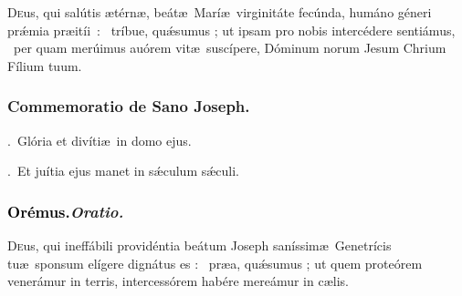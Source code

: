 \documentclass[12pt]{article} %
\newenvironment{response}{\leftskip 0in \setlength{\parindent}{0in}}{\vspace{2 mm}}
\let\oldgresixstar\gresixstar
\renewcommand{\gresixstar}{\textcolor{benred8}{\oldgresixstar}}
\let\oldgredagger\gredagger
\renewcommand{\gredagger}{\textcolor{benred8}{\oldgredagger}}
\let\oldVbar\Vbar
\renewcommand{\Vbar}{\textcolor{benred8}{\oldVbar .}}
\let\oldRbar\Rbar
\renewcommand{\Rbar}{\textcolor{benred8}{\oldRbar .}}
\def\capitulumSpace{\hspace{20 mm}}
\begin{document}
\begin{response}\lettrine{D}{e}us, qui sal\'{u}tis \ae t\'{e}rn\ae , be\'{a}t\ae\ Mar\'{i}\ae\ virginit\'{a}te fec\'{u}nda, hum\'{a}no g\'{e}neri pr\'{\ae}mia \mbox{pr\ae{}it\'{i}i : \gredagger} tr\'{i}bue, qu\'{\ae}sumus ; ut ipsam pro nobis interc\'{e}dere senti\'{a}mus, \gresixstar\ per quam mer\'{u}imus au\'{o}rem vit\ae\ susc\'{i}pere, D\'{o}minum norum Jesum Chrium F\'{i}lium tuum.

\end{response}


\subsubsection*{Commemoratio de Sano Joseph.}


\gresetfirstlineaboveinitial{\small \textsc{ \textbf{\textcolor{benred8}{VIII}}}}{\small \textsc{ \textbf{\textcolor{benred8}{VIII}}}}

\begin{response}
\Vbar\ Gl\'{o}ria et div\'{i}ti\ae\ in domo ejus.

\Rbar\ Et ju\'{i}tia ejus manet in s\'{\ae}culum s\'{\ae}culi.

\end{response}

\subsubsection*{\textcolor{black}{Or\'{e}mus.}\capitulumSpace \emph{Oratio.}}

\begin{response}\lettrine{D}{e}us, qui ineff\'{a}bili provid\'{e}ntia be\'{a}tum Joseph san\'{i}ssim\ae\ Genetr\'{i}cis tu\ae\ sponsum el\'{i}gere dign\'{a}tus es : \gresixstar\ pr\ae {}a, qu\'{\ae}sumus ; ut quem prote\'{o}rem vener\'{a}mur in terris, intercess\'{o}rem hab\'{e}re mere\'{a}mur in c\ae lis.

\end{response}

\end{document}
